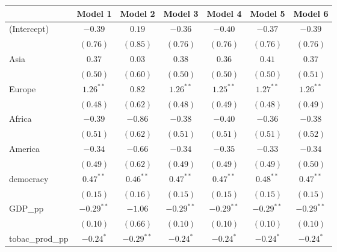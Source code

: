 
\begin{table}[!h]
\begin{center}
\begin{tabular}{l c c c c c c }
\toprule
 & Model 1 & Model 2 & Model 3 & Model 4 & Model 5 & Model 6 \\
\midrule
(Intercept)             & $-0.39$      & $0.19$       & $-0.36$      & $-0.40$      & $-0.37$      & $-0.39$      \\
                        & $(0.76)$     & $(0.85)$     & $(0.76)$     & $(0.76)$     & $(0.76)$     & $(0.76)$     \\
Asia                    & $0.37$       & $0.03$       & $0.38$       & $0.36$       & $0.41$       & $0.37$       \\
                        & $(0.50)$     & $(0.60)$     & $(0.50)$     & $(0.50)$     & $(0.50)$     & $(0.51)$     \\
Europe                  & $1.26^{**}$  & $0.82$       & $1.26^{**}$  & $1.25^{**}$  & $1.27^{**}$  & $1.26^{**}$  \\
                        & $(0.48)$     & $(0.62)$     & $(0.48)$     & $(0.49)$     & $(0.48)$     & $(0.49)$     \\
Africa                  & $-0.39$      & $-0.86$      & $-0.38$      & $-0.40$      & $-0.36$      & $-0.38$      \\
                        & $(0.51)$     & $(0.62)$     & $(0.51)$     & $(0.51)$     & $(0.51)$     & $(0.52)$     \\
America                 & $-0.34$      & $-0.66$      & $-0.34$      & $-0.35$      & $-0.33$      & $-0.34$      \\
                        & $(0.49)$     & $(0.62)$     & $(0.49)$     & $(0.49)$     & $(0.49)$     & $(0.50)$     \\
democracy               & $0.47^{**}$  & $0.46^{**}$  & $0.47^{**}$  & $0.47^{**}$  & $0.48^{**}$  & $0.47^{**}$  \\
                        & $(0.15)$     & $(0.16)$     & $(0.15)$     & $(0.15)$     & $(0.15)$     & $(0.15)$     \\
GDP\_pp                 & $-0.29^{**}$ & $-1.06$      & $-0.29^{**}$ & $-0.29^{**}$ & $-0.29^{**}$ & $-0.29^{**}$ \\
                        & $(0.10)$     & $(0.66)$     & $(0.10)$     & $(0.10)$     & $(0.10)$     & $(0.10)$     \\
tobac\_prod\_pp         & $-0.24^{*}$  & $-0.29^{**}$ & $-0.24^{*}$  & $-0.24^{*}$  & $-0.24^{*}$  & $-0.24^{*}$  \\

\end{tabular}
\end{center}
\end{table}
